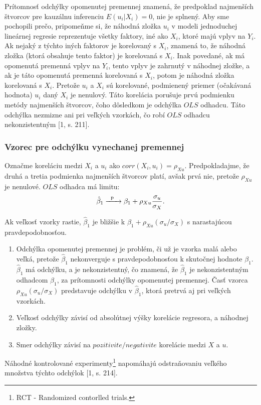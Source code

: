 \documentclass[]{tukediphc}
\begin{document}
Prítomnosť odchýlky opomenutej premennej znamená, že predpoklad najmenších štvorcov pre kauzálnu inferenciu $E(u_{i} | X_{i}) = 0$, nie je splnený. Aby sme pochopili prečo, pripomeňme si, že náhodná zložka $u_i$ v modeli jednoduchej lineárnej regresie reprezentuje všetky faktory, iné ako $X_{i}$, ktoré majú vplyv na $Y_{i}$. Ak nejaký z týchto iných faktorov je korelovaný s $X_{i}$, znamená to, že náhodná zložka (ktorá obsahuje tento faktor) je korelovaná s $X_{i}$. Inak povedané, ak má opomenutá premenná vplyv na $Y_{i}$, tento vplyv je zahrnutý v náhodnej zložke, a ak je táto opomenutá premenná korelovaná s $X_{i}$, potom je náhodná zložka korelovaná s $X_{i}$. Pretože $u_{i}$ a $X_{i}$ sú korelované, podmienený priemer (očakávaná hodnota) $u_{i}$ daný $X_{i}$ je nenulový. Táto korelácia porušuje prvú podmienku metódy najmenších štvorcov, čoho dôsledkom je odchýlka $OLS$ odhadcu. Táto odchýlka nezmizne ani pri veľkých vzorkách, čo robí $OLS$ odhadcu nekonzistentným [1, s. 211]. 

\subsubsection{Vzorec pre odchýlku vynechanej premennej}

Označme koreláciu medzi $X_{i}$ a $u_{i}$ ako $corr(X_{i}, u_{i}) = \rho_{Xu}$. Predpokladajme, že druhá a tretia podmienka najmenších štvorcov platí, avšak prvá nie, pretože $\rho_{Xu}$ je nenulové. $OLS$ odhadca má limitu:
\begin{equation}
    \hat\beta_{1}\xrightarrow[\text{}]{\text{\; p \; }}\beta_{1}+\rho_{Xu}\frac{\sigma_{u}}{\sigma_{X}}.
\end{equation}

Ak veľkosť vzorky rastie, $\hat\beta_{1}$ je bližšie k $\beta_{1} + \rho_{Xu}(\sigma_{u} / \sigma_{X})$ s narastajúcou pravdepodobnosťou. 
\begin{enumerate}
\item  Odchýlka opomenutej premennej je problém, či už je vzorka malá alebo veľká, pretože $\hat\beta_{1}$  nekonverguje s pravdepodobnosťou k skutočnej hodnote $\beta_{1}$. $\hat\beta_{1}$ má odchýlku, a je nekonzistentný, čo znamená, že $\hat\beta_{1}$ je nekonzistentným odhadcom $\beta_{1}$, za prítomnosti odchýlky opomenutej premennej. Časť vzorca $\rho_{Xu}(\sigma_{u} / \sigma_{X})$ predstavuje odchýlku v $\hat\beta_{1}$, ktorá pretrvá aj pri veľkých vzorkách.  
\item Veľkosť odchýlky závisí od absolútnej výšky korelácie regresora, a náhodnej zložky. 
\item Smer odchýlky závisí na $pozitivite / negativite$ korelácie medzi $X$ a $u$.
\end{enumerate}
Náhodné kontrolované experimenty\footnote{RCT - Randomized contorlled trials.} napomáhajú odstraňovaniu veľkého množstva týchto odchýlok [1, s. 214].
\end{document}
